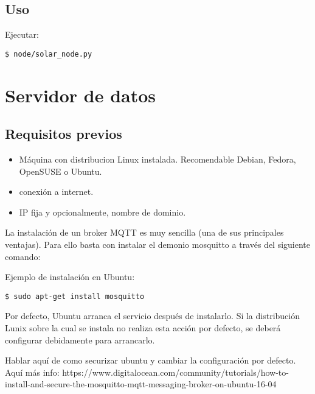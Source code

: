 \subsection{Uso}
\label{makereference5.1.5}
Ejecutar:
\begin{lstlisting}[frame=single]
$ node/solar_node.py
\end{lstlisting}

\section{Servidor de datos}
\label{makereference5.2}
\subsection{Requisitos previos}
\begin{itemize}
\item Máquina con distribucion Linux instalada. Recomendable Debian, Fedora, OpenSUSE o Ubuntu.
\item conexión a internet.
\item IP fija y opcionalmente, nombre de dominio.
\end{itemize}

La instalación de un broker MQTT es muy sencilla (una de sus principales ventajas). Para ello basta con instalar el demonio mosquitto a través del siguiente comando:

Ejemplo de instalación en Ubuntu:
\lstset{language=bash}
\begin{lstlisting}[frame=single]
$ sudo apt-get install mosquitto
\end{lstlisting}

Por defecto, Ubuntu arranca el servicio después de instalarlo. Si la distribución Lunix sobre la cual se instala no realiza esta acción por defecto, se deberá configurar debidamente para arrancarlo.

Hablar aquí de como securizar ubuntu y cambiar la configuración por defecto.
Aquí más info: https://www.digitalocean.com/community/tutorials/how-to-install-and-secure-the-mosquitto-mqtt-messaging-broker-on-ubuntu-16-04